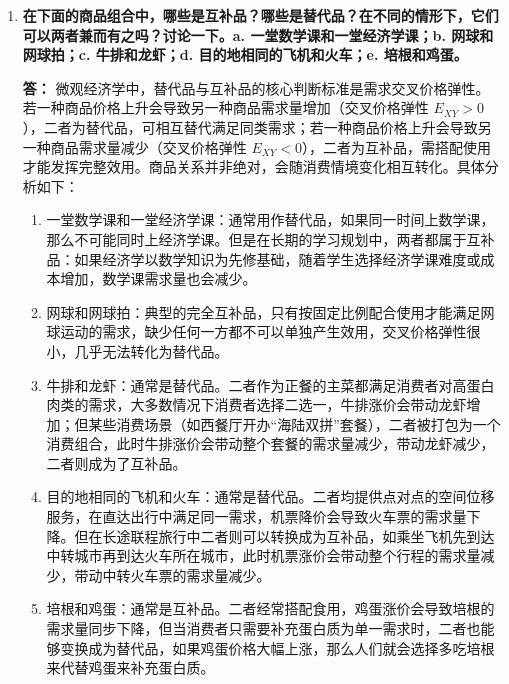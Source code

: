 \begin{enumerate}[label=\textbf{\arabic*.}, leftmargin=*]
		\textbf{答：}
		额外一张门票的经济价值大于 10 美元。
		
		商品的边际价值是由消费者为了得到该商品愿意支付最高的价格来决定的，假如一张门票在官方限价上涨10美元且导致了市场严重供不应求时，那么能让市场真正出清的均衡价格远远大于10美元。这个时候许多未买到票的人在私下交易或心理预估中也已经愿意支付超过官方定价的金额。因此，有这样一张门票的真实价值必然大于10美元，可以通过观察黑市的交易价格或问卷调查消费者支付意愿的最高价格来确定。
		
		\item \textbf{在下面的商品组合中，哪些是互补品？哪些是替代品？在不同的情形下，它们可以两者兼而有之吗？讨论一下。a. 一堂数学课和一堂经济学课；b. 网球和网球拍；c. 牛排和龙虾；d. 目的地相同的飞机和火车；e. 培根和鸡蛋。}
		
		\textbf{答：}
		微观经济学中，替代品与互补品的核心判断标准是需求交叉价格弹性。若一种商品价格上升会导致另一种商品需求量增加（交叉价格弹性 $E_{XY} > 0$），二者为替代品，可相互替代满足同类需求；若一种商品价格上升会导致另一种商品需求量减少（交叉价格弹性 $E_{XY} < 0$），二者为互补品，需搭配使用才能发挥完整效用。商品关系并非绝对，会随消费情境变化相互转化。具体分析如下：
		\begin{enumerate}[label=\alph*., leftmargin=*]
			\item 一堂数学课和一堂经济学课：通常用作替代品，如果同一时间上数学课，那么不可能同时上经济学课。但是在长期的学习规划中，两者都属于互补品：如果经济学以数学知识为先修基础，随着学生选择经济学课难度或成本增加，数学课需求量也会减少。
			\item 网球和网球拍：典型的完全互补品，只有按固定比例配合使用才能满足网球运动的需求，缺少任何一方都不可以单独产生效用，交叉价格弹性很小，几乎无法转化为替代品。
			\item 牛排和龙虾：通常是替代品。二者作为正餐的主菜都满足消费者对高蛋白肉类的需求，大多数情况下消费者选择二选一，牛排涨价会带动龙虾增加；但某些消费场景（如西餐厅开办“海陆双拼”套餐），二者被打包为一个消费组合，此时牛排涨价会带动整个套餐的需求量减少，带动龙虾减少，二者则成为了互补品。
			\item 目的地相同的飞机和火车：通常是替代品。二者均提供点对点的空间位移服务，在直达出行中满足同一需求，机票降价会导致火车票的需求量下降。但在长途联程旅行中二者则可以转换成为互补品，如乘坐飞机先到达中转城市再到达火车所在城市，此时机票涨价会带动整个行程的需求量减少，带动中转火车票的需求量减少。
			\item 培根和鸡蛋：通常是互补品。二者经常搭配食用，鸡蛋涨价会导致培根的需求量同步下降，但当消费者只需要补充蛋白质为单一需求时，二者也能够变换成为替代品，如果鸡蛋价格大幅上涨，那么人们就会选择多吃培根来代替鸡蛋来补充蛋白质。
		\end{enumerate}
		

\end{enumerate}
